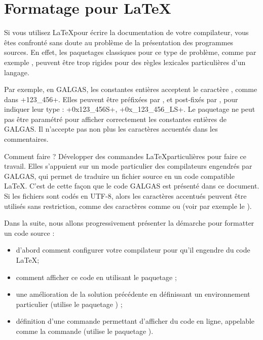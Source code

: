 
\chapter{Formatage pour LaTeX}

Si vous utilisez \LaTeX pour écrire la documentation de votre compilateur, vous êtes confronté sans doute au problème de la présentation des programmes sources. En effet, les paquetages classiques pour ce type de problème, comme par exemple , peuvent être trop rigides pour des règles lexicales particulières d'un langage.

Par exemple, en GALGAS, les constantes entières acceptent le caractère \tpp{\_}, comme dans \ggs+123_456+. Elles peuvent être préfixées par , et post-fixés par ,  pour indiquer leur type : \ggs+0x123_456S+, \ggs+0x_123_456_LS+. Le paquetage  ne peut pas être paramétré pour afficher correctement les constantes entières de GALGAS. Il n'accepte pas non plus les caractères accuentés dans les commentaires.

Comment faire ? Développer des commandes \LaTeX particulières pour faire ce travail. Elles s'appuient sur un mode particulier des compilateurs engendrés par GALGAS, qui permet de traduire un fichier source en un code compatible \LaTeX. C'est de cette façon que le code GALGAS est présenté dans ce document. Si les fichiers  sont codés en UTF-8, alors les caractères accentués peuvent être utilisés sans restriction, comme des caractères comme  ou  (voir par exemple le ).

Dans la suite, nous allons progressivement présenter la démarche pour formatter un code source :
\begin{itemize}
  \item d'abord comment configurer votre compilateur pour qu'il engendre du code \LaTeX ;
  \item comment afficher ce code en utilisant le paquetage  ;
  \item une amélioration de la solution précédente en définissant un environnement particulier (utilise le paquetage ) ;
  \item définition d'une commande permettant d'afficher du code en ligne, appelable comme la commande  (utilise le paquetage ).
\end{itemize}

